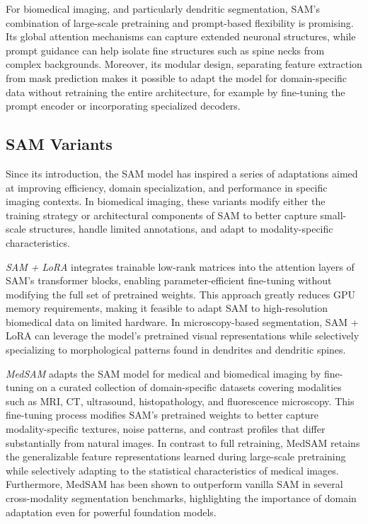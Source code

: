 For biomedical imaging, and particularly dendritic segmentation, \gls{SAM}’s combination of large-scale pretraining and prompt-based flexibility is promising. Its global attention mechanisms can capture extended neuronal structures, while prompt guidance can help isolate fine structures such as spine necks from complex backgrounds. Moreover, its modular design, separating feature extraction from mask prediction makes it possible to adapt the model for domain-specific data without retraining the entire architecture, for example by fine-tuning the prompt encoder or incorporating specialized decoders. 

\subsection{SAM Variants}
Since its introduction, the \gls{SAM} model has inspired a series of adaptations aimed at improving efficiency, domain specialization, and performance in specific imaging contexts. In biomedical imaging, these variants modify either the training strategy or architectural components of \gls{SAM} to better capture small-scale structures, handle limited annotations, and adapt to modality-specific characteristics.

\textit{\gls{SAM} + \gls{LoRA}} \cite{Hu_2021} integrates trainable low-rank matrices into the attention layers of \gls{SAM}’s transformer blocks, enabling parameter-efficient fine-tuning without modifying the full set of pretrained weights. This approach greatly reduces \gls{GPU} memory requirements, making it feasible to adapt \gls{SAM} to high-resolution biomedical data on limited hardware. In microscopy-based segmentation, \gls{SAM} + \gls{LoRA} can leverage the model’s pretrained visual representations while selectively specializing to morphological patterns found in dendrites and dendritic spines.

\textit{Med\gls{SAM}} \cite{Ma_2024} adapts the \gls{SAM} model for medical and biomedical imaging by fine-tuning on a curated collection of domain-specific datasets covering modalities such as \gls{MRI}, \gls{CT}, ultrasound, histopathology, and fluorescence microscopy. This fine-tuning process modifies \gls{SAM}’s pretrained weights to better capture modality-specific textures, noise patterns, and contrast profiles that differ substantially from natural images. In contrast to full retraining, Med\gls{SAM} retains the generalizable feature representations learned during large-scale pretraining while selectively adapting to the statistical characteristics of medical images. Furthermore, Med\gls{SAM} has been shown to outperform vanilla \gls{SAM} in several cross-modality segmentation benchmarks, highlighting the importance of domain adaptation even for powerful foundation models.

